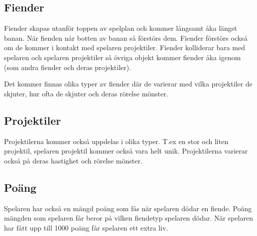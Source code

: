 \documentclass{TDP005mall}
\begin{document}
\subsection{Fiender}
Fiender skapas utanför toppen av spelplan och kommer långsamt åka längst banan. 
När fienden når botten av banan så förstörs dem.
Fiender förstörs också om de kommer i kontakt med spelaren projektiler.
Fiender kolliderar bara med spelaren och spelaren projektiler så övriga objekt kommer fiender åka igenom 
(som andra fiender och deras projektiler).

Det kommer finnas olika typer av fiender där de varierar med vilka projektiler de skjuter,
hur ofta de skjuter och deras rörelse mönster.
\subsection{Projektiler}
Projektilerna kommer också uppdelas i olika typer.
T.ex en stor och liten projektil, spelaren projektil kommer också vara helt unik.
Projektilerna varierar också på deras hastighet och rörelse mönster.

\subsection{Poäng}
Spelaren har också en mängd poäng som fås när spelaren dödar en fiende. 
Poäng mängden som spelaren får beror på vilken fiendetyp spelaren dödar.
När spelaren har fått upp till 1000 poäng får spelaren ett extra liv.
\end{document}
